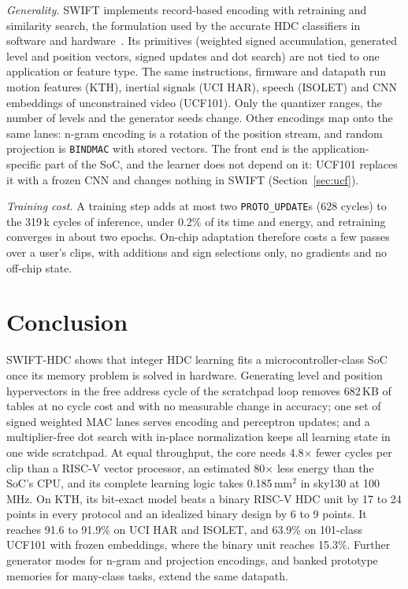 \documentclass[conference]{IEEEtran}
\begin{document}
\emph{Generality.} SWIFT implements record-based encoding with retraining and similarity search, the formulation used by the accurate HDC classifiers in software and hardware~\cite{onlinehd,generic}. Its primitives (weighted signed accumulation, generated level and position vectors, signed updates and dot search) are not tied to one application or feature type. The same instructions, firmware and datapath run motion features (KTH), inertial signals (UCI HAR), speech (ISOLET) and CNN embeddings of unconstrained video (UCF101). Only the quantizer ranges, the number of levels and the generator seeds change. Other encodings map onto the same lanes: n-gram encoding is a rotation of the position stream, and random projection is \texttt{BINDMAC} with stored vectors. The front end is the application-specific part of the SoC, and the learner does not depend on it: UCF101 replaces it with a frozen CNN and changes nothing in SWIFT (Section~\ref{sec:ucf}).

\emph{Training cost.} A training step adds at most two \texttt{PROTO\_UPDATE}s (628 cycles) to the 319\,k cycles of inference, under 0.2\% of its time and energy, and retraining converges in about two epochs. On-chip adaptation therefore costs a few passes over a user's clips, with additions and sign selections only, no gradients and no off-chip state.

\section{Conclusion}
SWIFT-HDC shows that integer HDC learning fits a microcontroller-class SoC once its memory problem is solved in hardware. Generating level and position hypervectors in the free address cycle of the scratchpad loop removes 682\,KB of tables at no cycle cost and with no measurable change in accuracy; one set of signed weighted MAC lanes serves encoding and perceptron updates; and a multiplier-free dot search with in-place normalization keeps all learning state in one wide scratchpad.
At equal throughput, the core needs 4.8$\times$ fewer cycles per clip than a RISC-V vector processor, an estimated 80$\times$ less energy than the SoC's CPU, and its complete learning logic takes 0.185\,mm$^2$ in sky130 at 100\,MHz. On KTH, its bit-exact model beats a binary RISC-V HDC unit by 17 to 24 points in every protocol and an idealized binary design by 6 to 9 points. It reaches 91.6 to 91.9\% on UCI HAR and ISOLET, and 63.9\% on 101-class UCF101 with frozen embeddings, where the binary unit reaches 15.3\%. Further generator modes for n-gram and projection encodings, and banked prototype memories for many-class tasks, extend the same datapath.



\end{document}
